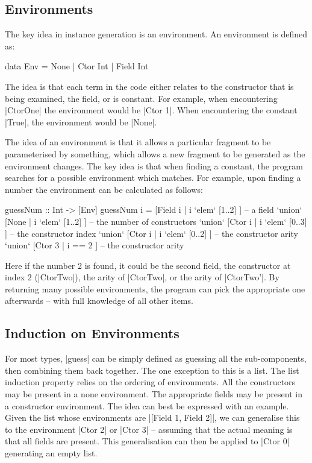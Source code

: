 \documentclass{llncs}
\begin{document}
\subsection{Environments}

The key idea in instance generation is an environment. An environment is defined as:

\begin{code}
data Env = None | Ctor Int | Field Int
\end{code}

The idea is that each term in the code either relates to the constructor that is being examined, the field, or is constant. For example, when encountering |CtorOne| the environment would be |Ctor 1|. When encountering the constant |True|, the environment would be |None|.

The idea of an environment is that it allows a particular fragment to be parameterised by something, which allows a new fragment to be generated as the environment changes. The key idea is that when finding a constant, the program searches for a possible environment which matches. For example, upon finding a number the environment can be calculated as follows:

\begin{code}
guessNum :: Int -> [Env]
guessNum i  =        [Field i  | i `elem` [1..2]  ]  -- a field
            `union`  [None     | i `elem` [1..2]  ]  -- the number of constructors
            `union`  [Ctor i   | i `elem` [0..3]  ]  -- the constructor index
            `union`  [Ctor i   | i `elem` [0..2]  ]  -- the constructor arity
            `union`  [Ctor 3   | i == 2           ]  -- the constructor arity
\end{code}

Here if the number 2 is found, it could be the second field, the constructor at index 2 (|CtorTwo|), the arity of |CtorTwo|, or the arity of |CtorTwo'|. By returning many possible environments, the program can pick the appropriate one afterwards -- with full knowledge of all other items.

\subsection{Induction on Environments}

For most types, |guess| can be simply defined as guessing all the sub-components, then combining them back together. The one exception to this is a list. The list induction property relies on the ordering of environments. All the constructors may be present in a none environment. The appropriate fields may be present in a constructor environment. The idea can best be expressed with an example. Given the list whose environments are |[Field 1, Field 2]|, we can generalise this to the environment |Ctor 2| or |Ctor 3| -- assuming that the actual meaning is that all fields are present. This generalisation can then be applied to |Ctor 0| generating an empty list.
\end{document}
